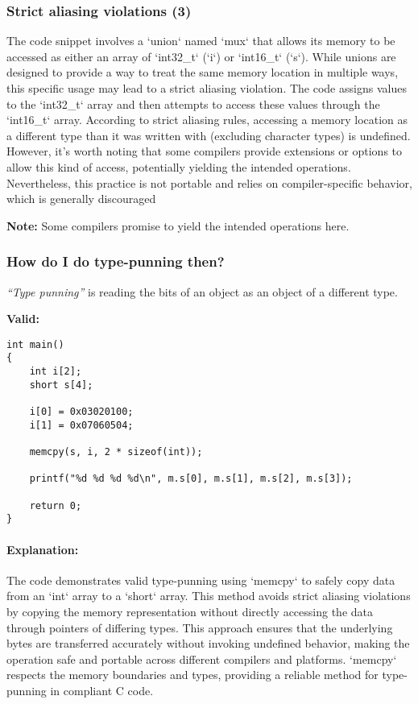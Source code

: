 \documentclass[12pt]{article}
\begin{document}
\subsubsection{Strict aliasing violations (3)}

The code snippet involves a `union` named `mux` that allows its memory to be accessed as either an array of `int32\_t` (`i`) or `int16\_t` (`s`). While unions are designed to provide a way to treat the same memory location in multiple ways, this specific usage may lead to a strict aliasing violation. The code assigns values to the `int32\_t` array and then attempts to access these values through the `int16\_t` array. According to strict aliasing rules, accessing a memory location as a different type than it was written with (excluding character types) is undefined. However, it's worth noting that some compilers provide extensions or options to allow this kind of access, potentially yielding the intended operations. Nevertheless, this practice is not portable and relies on compiler-specific behavior, which is generally discouraged

\textbf{Note:} Some compilers promise to yield the intended operations here.

\subsubsection{How do I do type-punning then?}

\textit{``Type punning''} is reading the bits of an object as an object of a different type.

\textbf{Valid:}

\begin{verbatim}
int main()
{
    int i[2];
    short s[4];

    i[0] = 0x03020100;
    i[1] = 0x07060504;

    memcpy(s, i, 2 * sizeof(int));

    printf("%d %d %d %d\n", m.s[0], m.s[1], m.s[2], m.s[3]);

    return 0;
}
\end{verbatim}

\paragraph{Explanation:}
The code demonstrates valid type-punning using `memcpy` to safely copy data from an `int` array to a `short` array. This method avoids strict aliasing violations by copying the memory representation without directly accessing the data through pointers of differing types. This approach ensures that the underlying bytes are transferred accurately without invoking undefined behavior, making the operation safe and portable across different compilers and platforms. `memcpy` respects the memory boundaries and types, providing a reliable method for type-punning in compliant C code.
\end{document}
